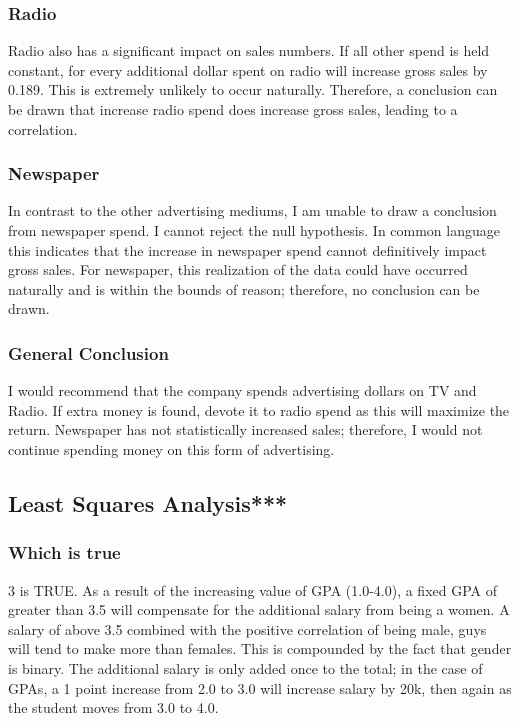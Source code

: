 \documentclass[11pt]{article}
\begin{document}
\subsubsection{Radio}\label{radio}

Radio also has a significant impact on sales numbers. If all other spend
is held constant, for every additional dollar spent on radio will
increase gross sales by 0.189. This is extremely unlikely to occur
naturally. Therefore, a conclusion can be drawn that increase radio
spend does increase gross sales, leading to a correlation.

\subsubsection{Newspaper}\label{newspaper}

In contrast to the other advertising mediums, I am unable to draw a
conclusion from newspaper spend. I cannot reject the null hypothesis. In
common language this indicates that the increase in newspaper spend
cannot definitively impact gross sales. For newspaper, this realization
of the data could have occurred naturally and is within the bounds of
reason; therefore, no conclusion can be drawn.

\subsubsection{General Conclusion}\label{general-conclusion}

I would recommend that the company spends advertising dollars on TV and
Radio. If extra money is found, devote it to radio spend as this will
maximize the return. Newspaper has not statistically increased sales;
therefore, I would not continue spending money on this form of
advertising.

    \subsection{Least Squares Analysis***}\label{least-squares-analysis}

    \subsubsection{Which is true}\label{truefalse}

  3 is TRUE. As a result of the increasing value of GPA (1.0-4.0), a fixed
  GPA of greater than 3.5 will compensate for the additional salary from
  being a women. A salary of above 3.5 combined with the positive
  correlation of being male, guys will tend to make more than females.
  This is compounded by the fact that gender is binary. The additional
  salary is only added once to the total; in the case of GPAs, a 1 point
  increase from 2.0 to 3.0 will increase salary by 20k, then again as
  the student moves from 3.0 to 4.0.
\end{document}
